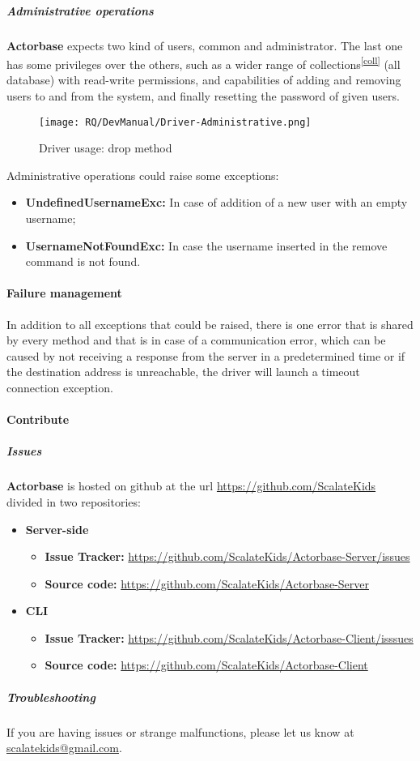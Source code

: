 \documentclass{scalatekids-article}
\begin{document}
\subparagraph{Administrative operations}

\textbf{Actorbase} expects two kind of users, common and administrator. The last one has
some privileges over the others, such as a wider range of collections\textsuperscript{\ref{coll}} (all
database) with read-write permissions, and capabilities of adding and removing
users to and from the system, and finally resetting the password of given users.
 \begin{figure}[H]
   \begin{center}
     \texttt{[image: RQ/DevManual/Driver-Administrative.png]}
     \caption{Driver usage: drop method}
   \end{center}
 \end{figure}
Administrative operations could raise some exceptions:
\begin{itemize}
\item \textbf{UndefinedUsernameExc:} In case of addition of a new user with an empty username;
\item \textbf{UsernameNotFoundExc:} In case the username inserted in the remove command is not found.
\end{itemize}

\paragraph{Failure management}

In addition to all exceptions that could be raised, there is one error that is
shared by every method and that is in case of a communication error, which can
be caused by not receiving a response from the server in a predetermined time or 
if the destination address is unreachable, the driver will launch a
timeout connection exception.

\paragraph{Contribute}

\subparagraph{Issues}

\textbf{Actorbase} is hosted on github at the url
\url{https://github.com/ScalateKids} divided in two repositories:

\begin{itemize}
\item\textbf{Server-side}
  \begin{itemize}
  \item \textbf{Issue Tracker:} \url{https://github.com/ScalateKids/Actorbase-Server/issues}
  \item \textbf{Source code:} \url{https://github.com/ScalateKids/Actorbase-Server}
  \end{itemize}
\item\textbf{CLI}
  \begin{itemize}
  \item \textbf{Issue Tracker:} \url{https://github.com/ScalateKids/Actorbase-Client/isssues}
  \item \textbf{Source code:} \url{https://github.com/ScalateKids/Actorbase-Client}
  \end{itemize}
\end{itemize}

\subparagraph{Troubleshooting}

If you are having issues or strange malfunctions, please let us know at
\href{mailto:scalatekids@gmail.com}{scalatekids@gmail.com}.
\end{document}
